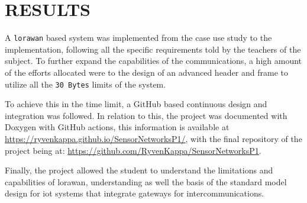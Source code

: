 \section{RESULTS}

A \texttt{lorawan} based system was implemented from the case use study to the implementation, following all the specific requirements told by the teachers of the subject. 
To further expand the capabilities of the communications, a high amount of the efforts allocated were to the design of an advanced header and frame to utilize all the 
\texttt{30 Bytes} limits of the system.

To achieve this in the time limit, a GitHub based continuous design and integration was followed. In relation to this, the project was documented with Doxygen with GitHub actions, this information 
is available at \url{https://ryvenkappa.github.io/SensorNetworksP1/}, with the final repository of the project being at: \url{https://github.com/RyvenKappa/SensorNetworksP1}.

Finally, the project allowed the student to understand the limitations and capabilities of \acrshort{lorawan}, understanding as well the basis of the standard model design 
for \acrshort{iot} systems that integrate gateways for intercommunications.



